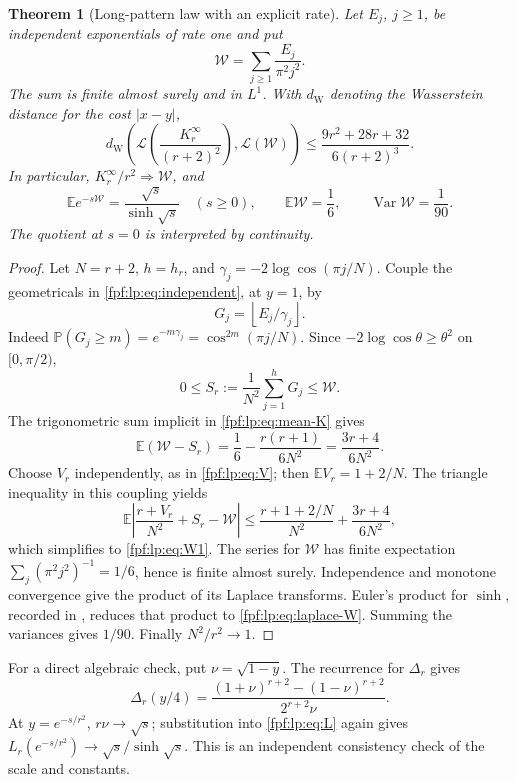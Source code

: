 \documentclass[11pt]{article}
\numberwithin{equation}{section}
\newtheorem{theorem}{Theorem}[section]
\theoremstyle{definition}
\newcommand{\E}{\mathbb E}
\newcommand{\Prob}{\mathbb P}
\newcommand{\Var}{\operatorname{Var}}
\newcommand{\Law}{\mathcal L}
\begin{document}
\begin{theorem}[Long-pattern law with an explicit rate]\label{fpf:lp:thm:growing}
Let \(E_j\), \(j\ge1\), be independent exponentials of rate one and put
\begin{equation}\label{fpf:lp:eq:W}
 \mathcal W=\sum_{j\ge1}\frac{E_j}{\pi^2j^2}.
\end{equation}
The sum is finite almost surely and in \(L^1\). With \(d_{\mathrm W}\)
denoting the Wasserstein distance for the cost \(|x-y|\),
\begin{equation}\label{fpf:lp:eq:W1}
 d_{\mathrm W}\!\left(\Law\!\left(\frac{K_r^\infty}{(r+2)^2}\right),
 \Law(\mathcal W)\right)
 \le\frac{9r^2+28r+32}{6(r+2)^3}.
\end{equation}
In particular, \(K_r^\infty/r^2\Rightarrow \mathcal W\), and
\begin{equation}\label{fpf:lp:eq:laplace-W}
 \E e^{-s\mathcal W}=\frac{\sqrt{s}}{\sinh\sqrt{s}}\quad(s\ge0),\qquad
 \E \mathcal W=\frac16,\qquad\Var \mathcal W=\frac1{90}.
\end{equation}
The quotient at \(s=0\) is interpreted by continuity.
\end{theorem}
\begin{proof}
Let \(N=r+2\), \(h=h_r\), and
\(\gamma_j=-2\log\cos(\pi j/N)\). Couple the geometricals in
\eqref{fpf:lp:eq:independent}, at \(y=1\), by
\[
 G_j=\left\lfloor E_j/\gamma_j\right\rfloor.
\]
Indeed \(\Prob(G_j\ge m)=e^{-m\gamma_j}
=\cos^{2m}(\pi j/N)\). Since
\(-2\log\cos\theta\ge\theta^2\) on \([0,\pi/2)\),
\[
 0\le S_r:=\frac1{N^2}\sum_{j=1}^hG_j\le \mathcal W.
\]
The trigonometric sum implicit in \eqref{fpf:lp:eq:mean-K} gives
\[
 \E(\mathcal W-S_r)=\frac16-\frac{r(r+1)}{6N^2}
 =\frac{3r+4}{6N^2}.
\]
Choose \(V_r\) independently, as in \eqref{fpf:lp:eq:V}; then
\(\E V_r=1+2/N\). The triangle inequality in this coupling yields
\[
 \E\left|\frac{r+V_r}{N^2}+S_r-\mathcal W\right|
 \le\frac{r+1+2/N}{N^2}+\frac{3r+4}{6N^2},
\]
which simplifies to \eqref{fpf:lp:eq:W1}. The series for \(\mathcal W\) has
finite expectation \(\sum_j(\pi^2j^2)^{-1}=1/6\), hence is finite almost
surely. Independence and monotone convergence give the product of its
Laplace transforms. Euler's product for \(\sinh\), recorded in
\cite{fpf-lp-dlmf}, reduces that product to \eqref{fpf:lp:eq:laplace-W}.
Summing the variances gives \(1/90\). Finally \(N^2/r^2\to1\).
\end{proof}

For a direct algebraic check, put \(\nu=\sqrt{1-y}\). The recurrence for
\(\Delta_r\) gives
\begin{equation}\label{fpf:lp:eq:D-two-roots}
 \Delta_r(y/4)=
 \frac{(1+\nu)^{r+2}-(1-\nu)^{r+2}}{2^{r+2}\nu}.
\end{equation}
At \(y=e^{-s/r^2}\), \(r\nu\to\sqrt{s}\); substitution into
\eqref{fpf:lp:eq:L} again gives \(L_r(e^{-s/r^2})\to\sqrt{s}/\sinh\sqrt{s}\).
This is an independent consistency check of the scale and constants.
\end{document}
